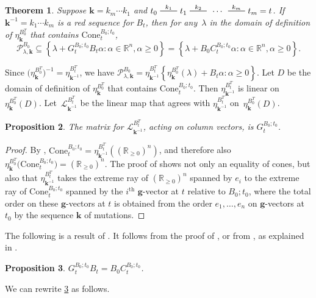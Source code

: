 \documentclass{amsart}
\newtheorem{proposition}{Proposition}[section]
\newtheorem{theorem}[proposition]{Theorem}
\theoremstyle{definition}
\theoremstyle{remark}
\numberwithin{equation}{section}
\newcommand{\reals}{\mathbb R}
\newcommand{\edge}{\,\,\rule[2.7pt]{20pt}{0.5pt}\,\,}
\newcommand{\set}[1]{{\left\lbrace #1 \right\rbrace}}
\renewcommand{\th}{^\text{th}}
\newcommand{\0}{{\mathbf{0}}}
\newcommand{\Cone}{\mathrm{Cone}}
\newcommand{\g}{\mathbf{g}}
\newcommand{\kk}{\mathbf{k}}
\renewcommand{\L}{\mathcal{L}}
\renewcommand{\P}{\mathcal{P}}
\renewcommand{\th}{^\text{th}}
\begin{document}
\begin{theorem}\label{P in B0C}
Suppose $\kk=k_m\cdots k_1$ and $t_0\overset{k_1}{\edge}t_1\overset{k_2}{\edge}\,\cdots\,\overset{k_m}{\edge}t_m=t$.
If $\kk^{-1}=k_1\cdots k_m$ is a red sequence for $B_t$, then for any~$\lambda$ in the domain of definition of $\eta_\kk^{B_0^T}$ that contains $\Cone^{B_0;t_0}_t$,
\[\P^{B_0}_{\lambda,\kk}\subseteq\set{\lambda+G_t^{B_0;t_0}B_t\alpha:\alpha\in\reals^n,\alpha\ge0}=\set{\lambda+B_0C_t^{B_0;t_0}\alpha:\alpha\in\reals^n,\alpha\ge0}.\]
\end{theorem}

Since $\bigl(\eta_{\kk}^{B_0^T}\bigr)^{-1}=\eta_{\kk^{-1}}^{B_t^T}$, we have $\P^{B_0}_{\lambda,\kk}=\eta_{\kk^{-1}}^{B_t^T}\set{\eta_\kk^{B_0^T}(\lambda)+B_t\alpha:\alpha\ge0}$.
Let $D$ be the domain of definition of $\eta_{\kk}^{B_0^T}$  that contains $\Cone^{B_0;t_0}_t$.
Then $\eta_{\kk^{-1}}^{B_t^T}$ is linear on $\eta_{\kk}^{B_0^T}(D)$.
Let~$\L_{\kk^{-1}}^{B_t^T}$ be the linear map that agrees with $\eta_{\kk^{-1}}^{B_t^T}$ on~$\eta_{\kk}^{B_0^T}(D)$.

\begin{proposition}\label{L mat}
The matrix for $\L_{\kk^{-1}}^{B_t^T}$, acting on column vectors, is $G_t^{B_0;t_0}$.
\end{proposition}
\begin{proof}
By \cite[Proposition~8.13]{universal}, $\Cone^{B_0;t_0}_t=\eta_{\kk^{-1}}^{B_t^T}\left(\left(\reals_{\ge0}\right)^n\right)$, and therefore also ${\eta_\kk^{B_0^T}\bigl(\Cone^{B_0;t_0}_t\bigr)=\left(\reals_{\ge0}\right)^n}$.
The proof of \cite[Proposition~8.13]{universal} shows not only an equality of cones, but also that $\eta_{\kk^{-1}}^{B_t^T}$ takes the extreme ray of $\left(\reals_{\ge0}\right)^n$ spanned by $e_i$ to the extreme ray of $\Cone^{B_0;t_0}_t$ spanned by the $i\th$ $\g$-vector at $t$ relative to $B_0;t_0$, where the total order on these $\g$-vectors at $t$ is obtained from the order $e_1,\ldots,e_n$ on $\g$-vectors at $t_0$ by the sequence $\kk$ of mutations.
\end{proof}

The following is a result of \cite{NZ12}.
It follows from the proof of \cite[Proposition~1.3]{NZ12}, or from \cite[(6.14)]{FZ07}, as explained in \cite[Remark~2.1]{NZ12}.

\begin{proposition}\label{GBBC}
$G_t^{B_0;t_0}B_t=B_0C_t^{B_0;t_0}$.
\end{proposition}

We can rewrite \cref{GBBC} as follows.
\end{document}

